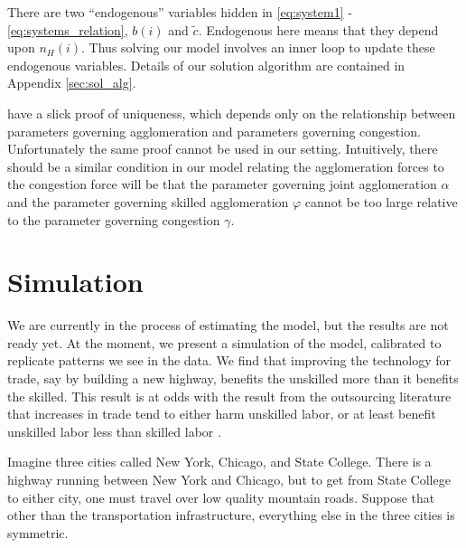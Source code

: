 \documentclass[12 pt]{article}
\begin{document}
There are two ``endogenous'' variables hidden in \eqref{eq:system1} - \eqref{eq:systems_relation}, $b(i)$ and $\tilde{c}$. Endogenous here means that they depend upon $n_H(i)$.  Thus solving our model involves an inner loop to update these endogenous variables.  Details of our solution algorithm are contained in Appendix \ref{sec:sol_alg}.

\citet{allen2014trade} have a slick proof of uniqueness, which depends only on the relationship between parameters governing agglomeration and parameters governing congestion.  Unfortunately the same proof cannot be used in our setting.  Intuitively, there should be a similar condition in our model relating the agglomeration forces to the congestion force will be that the parameter governing joint agglomeration $\alpha$ and the parameter governing skilled agglomeration $\varphi$ cannot be too large relative to the parameter governing congestion $\gamma$.  

\section{Simulation}

We are currently in the process of estimating the model, but the results are not ready yet.  At the moment, we present a simulation of the model, calibrated to replicate patterns we see in the data.  We find that improving the technology for trade, say by building a new highway, benefits the unskilled more than it benefits the skilled.  This result is at odds with the result from the outsourcing literature that increases in trade tend to either harm unskilled labor, or at least benefit unskilled labor less than skilled labor \citep{hummels2014wage}.

Imagine three cities called New York, Chicago, and State College.  There is a highway running between New York and Chicago, but to get from State College to either city, one must travel over low quality mountain roads.  Suppose that other than the transportation infrastructure, everything else in the three cities is symmetric.
\end{document}
